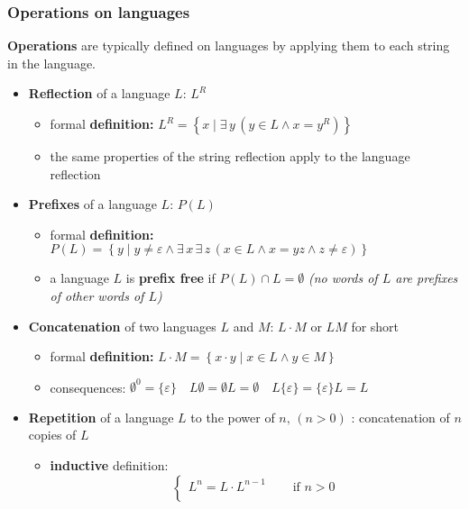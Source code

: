 \documentclass[english]{article}
\begin{document}
\subsubsection{Operations on languages}

\textbf{Operations} are typically defined on languages by applying them to each string in the language.

\begin{itemize}
  \item \textbf{Reflection} of a language \(L\): \(L^R\)
        \begin{itemize}
          \item formal \textbf{definition:} \(L^R = \left\{x \mid \exists \, y \, (y \in L \land x = y^R) \right\}\)
          \item the same properties of the string reflection apply to the language reflection
        \end{itemize}
  \item \textbf{Prefixes} of a language \(L\): \(P(L)\)
        \begin{itemize}
          \item formal \textbf{definition:} \(P(L) = \left\{y \mid y \neq \varepsilon \land \exists \, x \, \exists \, z \, (x \in L \land x = yz \land z \neq \varepsilon) \right\}\)
          \item a language \(L\) is \textbf{prefix free} if \(P(L) \cap L = \emptyset\) \textit{(no words of \(L\) are prefixes of other words of \(L\))}
        \end{itemize}
  \item \textbf{Concatenation} of two languages \(L\) and \(M\): \(L \cdot M\) or \(LM\) for short
        \begin{itemize}
          \item formal \textbf{definition:} \(L \cdot M = \left\{x \cdot y \mid x \in L \land y \in M \right\}\)
          \item consequences: \(\emptyset^0 = \{\varepsilon\} \quad L \emptyset = \emptyset L = \emptyset \quad L \{\varepsilon\} = \{\varepsilon\} L = L\)
        \end{itemize}
  \item \textbf{Repetition} of a language \(L\) to the power of \(n, \, (n > 0)\) : concatenation of \(n\) copies of \(L\)
        \begin{itemize}
          \item \textbf{inductive} definition: \[\begin{cases}
                    L ^ n = L \cdot L ^ {n - 1} \quad & \text{ if } n > 0  \\

\end{cases}\]
\end{itemize}
\end{itemize}
\end{document}
